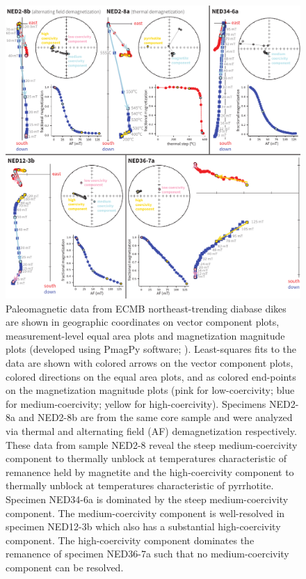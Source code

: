 \documentclass[draft]{agujournal2019}
\begin{document}
\begin{figure}[!ht]
\noindent\includegraphics[width=\textwidth]{./figures/paleomag_data.pdf}
\caption{\small{Paleomagnetic data from ECMB northeast-trending diabase dikes are shown in geographic coordinates on vector component plots, measurement-level equal area plots and magnetization magnitude plots (developed using PmagPy software; ). Least-squares fits to the data are shown with colored arrows on the vector component plots, colored directions on the equal area plots, and as colored end-points on the magnetization magnitude plots (pink for low-coercivity; blue for medium-coercivity; yellow for high-coercivity). Specimens NED2-8a and NED2-8b are from the same core sample and were analyzed via thermal and alternating field (AF) demagnetization respectively. These data from sample NED2-8 reveal the steep medium-coercivity component to thermally unblock at temperatures characteristic of remanence held by magnetite and the high-coercivity component to thermally unblock at temperatures characteristic of pyrrhotite. Specimen NED34-6a is dominated by the steep medium-coercivity component. The medium-coercivity component is well-resolved in specimen NED12-3b which also has a substantial high-coercivity component. The high-coercivity component dominates the remanence of specimen NED36-7a such that no medium-coercivity component can be resolved.}}
\label{fig:example_pmag}
\end{figure}
\end{document}
